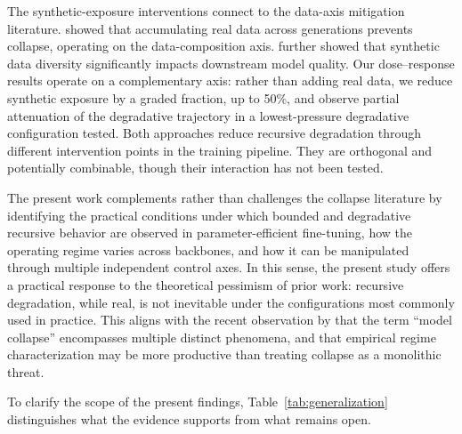 \documentclass[a4paper,fleqn]{cas-dc}
\newif\ifshowchanges
\newcommand{\rev}[1]{\ifshowchanges{\color{blue}#1}\else{#1}\fi}
\begin{document}
The synthetic-exposure interventions connect to the data-axis mitigation
literature. \citet{gerstgrasser2024} showed that accumulating real data across
generations prevents collapse, operating on the data-composition axis.
\citet{wang2024diversity} further showed that synthetic data diversity
significantly impacts downstream model quality. Our
\rev{dose--response results} operate on a complementary axis: rather than adding real data, we
reduce synthetic exposure by \rev{a graded fraction, up to 50\%, and observe partial attenuation of the degradative trajectory} in a
\rev{lowest-pressure degradative configuration tested}. Both approaches reduce recursive degradation through
different intervention points in the training pipeline. They are orthogonal and
potentially combinable, though their interaction has not been tested.

The present work complements rather than challenges the collapse literature by
identifying the practical conditions under which bounded and degradative
recursive behavior are observed in parameter-efficient fine-tuning, how the
operating regime varies across backbones, and how it can be manipulated through
multiple independent control axes. In this sense, the present study offers a
practical response to the theoretical pessimism of prior work: recursive
degradation, while real, is not inevitable under the configurations most
commonly used in practice. This aligns with the recent observation by
\citet{schaeffer2025position} that the term ``model collapse'' encompasses
multiple distinct phenomena, and that empirical regime characterization may be
more productive than treating collapse as a monolithic threat.

To clarify the scope of the present findings, Table~\ref{tab:generalization}
distinguishes what the evidence supports from what remains open.
\end{document}
